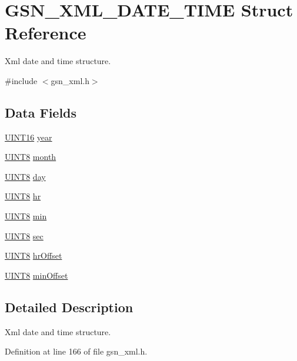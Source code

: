 \hypertarget{a00432}{
\section{GSN\_\-XML\_\-DATE\_\-TIME Struct Reference}
\label{a00432}
}


Xml date and time structure.  




{\ttfamily \#include $<$gsn\_\-xml.h$>$}

\subsection*{Data Fields}
\begin{DoxyCompactItemize}
\item 
\hyperlink{a00660_ga09f1a1fb2293e33483cc8d44aefb1eb1}{UINT16} \hyperlink{a00432_a15cf81be0bc3b33c7cc971ed1a815c74}{year}
\item 
\hyperlink{a00660_gab27e9918b538ce9d8ca692479b375b6a}{UINT8} \hyperlink{a00432_a9a7060ed27a8fc1c0a801ca792fbc955}{month}
\item 
\hyperlink{a00660_gab27e9918b538ce9d8ca692479b375b6a}{UINT8} \hyperlink{a00432_a2121477f11d8a58cddd6a8c0e9717476}{day}
\item 
\hyperlink{a00660_gab27e9918b538ce9d8ca692479b375b6a}{UINT8} \hyperlink{a00432_a5dff479f0f1395e93a28dd0c7b1335b2}{hr}
\item 
\hyperlink{a00660_gab27e9918b538ce9d8ca692479b375b6a}{UINT8} \hyperlink{a00432_afcd3b3e11f0b83ec71d50a827e42d9db}{min}
\item 
\hyperlink{a00660_gab27e9918b538ce9d8ca692479b375b6a}{UINT8} \hyperlink{a00432_a2edad25d34a288a33b77f09dfc71faa5}{sec}
\item 
\hyperlink{a00660_gab27e9918b538ce9d8ca692479b375b6a}{UINT8} \hyperlink{a00432_aad11de9474bbeeed27b4986d738cf48e}{hrOffset}
\item 
\hyperlink{a00660_gab27e9918b538ce9d8ca692479b375b6a}{UINT8} \hyperlink{a00432_ab33c78dee679b2e12fbc4a8f3ae4c933}{minOffset}
\end{DoxyCompactItemize}


\subsection{Detailed Description}
Xml date and time structure. 

Definition at line 166 of file gsn\_\-xml.h.



